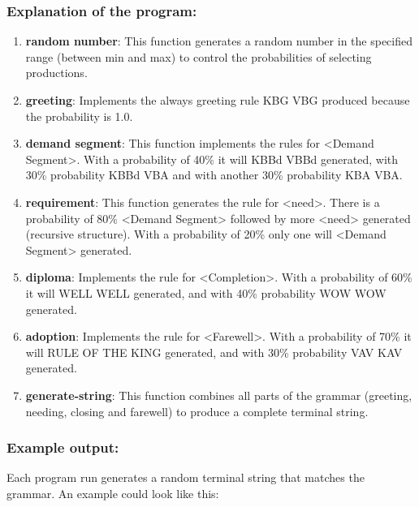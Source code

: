 \documentclass[
]{article}
\begin{document}
\subsubsection{\texorpdfstring{\textbf{Explanation of the
program:}}{Explanation of the program:}}\label{explanation-of-the-program-1}

\begin{enumerate}
\def\labelenumi{\arabic{enumi}.}
\item
  \textbf{random number}: This function generates a random number in the
  specified range (between min and max) to control the probabilities of
  selecting productions.
\item
  \textbf{greeting}: Implements the always greeting rule KBG VBG
  produced because the probability is 1.0.
\item
  \textbf{demand segment}: This function implements the rules for
  \textless Demand Segment\textgreater. With a probability of 40\% it
  will KBBd VBBd generated, with 30\% probability KBBd VBA and with
  another 30\% probability KBA VBA.
\item
  \textbf{requirement}: This function generates the rule for
  \textless need\textgreater. There is a probability of 80\%
  \textless Demand Segment\textgreater{} followed by more
  \textless need\textgreater{} generated (recursive structure). With a
  probability of 20\% only one will \textless Demand
  Segment\textgreater{} generated.
\item
  \textbf{diploma}: Implements the rule for
  \textless Completion\textgreater. With a probability of 60\% it will
  WELL WELL generated, and with 40\% probability WOW WOW generated.
\item
  \textbf{adoption}: Implements the rule for
  \textless Farewell\textgreater. With a probability of 70\% it will
  RULE OF THE KING generated, and with 30\% probability VAV KAV
  generated.
\item
  \textbf{generate-string}: This function combines all parts of the
  grammar (greeting, needing, closing and farewell) to produce a
  complete terminal string.
\end{enumerate}

\subsubsection{\texorpdfstring{\textbf{Example
output:}}{Example output:}}\label{example-output-1}

Each program run generates a random terminal string that matches the
grammar. An example could look like this:
\end{document}

